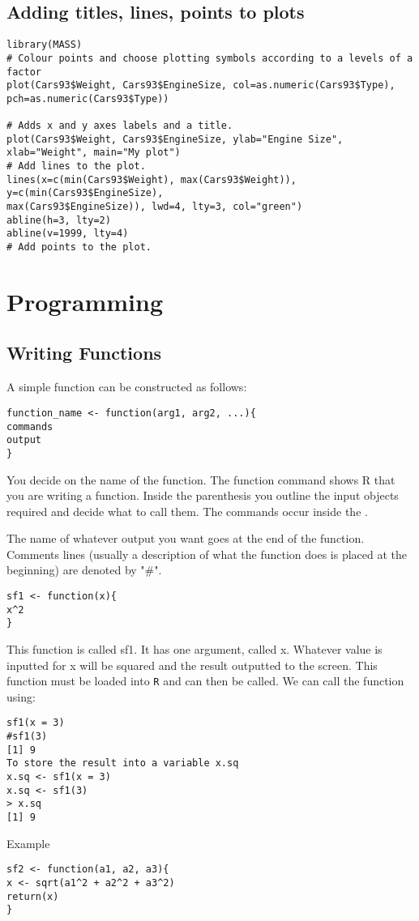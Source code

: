 \documentclass[a4paper,12pt]{article}
\begin{document}
\begin{itemize}
\section{Adding titles, lines, points to plots}


\footnotesize \begin{verbatim}
library(MASS)
# Colour points and choose plotting symbols according to a levels of a factor
plot(Cars93$Weight, Cars93$EngineSize, col=as.numeric(Cars93$Type),
pch=as.numeric(Cars93$Type))

# Adds x and y axes labels and a title.
plot(Cars93$Weight, Cars93$EngineSize, ylab="Engine Size",
xlab="Weight", main="My plot")
# Add lines to the plot.
lines(x=c(min(Cars93$Weight), max(Cars93$Weight)), y=c(min(Cars93$EngineSize),
max(Cars93$EngineSize)), lwd=4, lty=3, col="green")
abline(h=3, lty=2)
abline(v=1999, lty=4)
# Add points to the plot.
\end{verbatim}\normalsize

\newpage
\chapter{Programming}

\section{Writing Functions}

A simple function can be constructed as follows:

\begin{verbatim}
function_name <- function(arg1, arg2, ...){
commands
output
}
\end{verbatim}

You decide on the name of the function. The function command shows R that you are writing a function. Inside the parenthesis you outline the input objects required and decide what to call them. The commands occur inside the { }.

The name of whatever output you want goes at the end of the function. Comments lines (usually a description of what the function does is placed at the beginning) are denoted by "\#".

\begin{verbatim}sf1 <- function(x){
x^2
}
\end{verbatim}

This function is called sf1. It has one argument, called x.
Whatever value is inputted for x will be squared and the result outputted to the screen. This function must be loaded into \texttt{R} and can then be called. We can call the function using:
\begin{verbatim}
sf1(x = 3)
#sf1(3)
[1] 9
To store the result into a variable x.sq
x.sq <- sf1(x = 3)
x.sq <- sf1(3)
> x.sq
[1] 9
\end{verbatim}
Example
\begin{verbatim}
sf2 <- function(a1, a2, a3){
x <- sqrt(a1^2 + a2^2 + a3^2)
return(x)
}
\end{verbatim}


\end{itemize}
\end{document}
